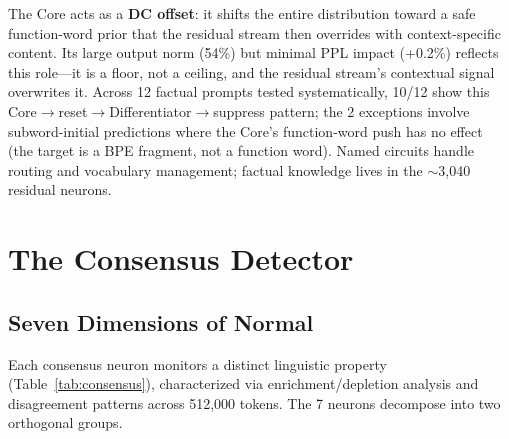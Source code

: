 \documentclass{article}
\begin{document}
The Core acts as a \textbf{DC offset}: it shifts the entire distribution toward
a safe function-word prior that the residual stream then overrides with
context-specific content.
Its large output norm (54\%) but minimal PPL impact (+0.2\%) reflects this
role---it is a floor, not a ceiling, and the residual stream's contextual
signal overwrites it.
Across 12 factual prompts tested systematically, 10/12 show this
Core$\to$reset$\to$Differentiator$\to$suppress pattern; the 2 exceptions
involve subword-initial predictions where the Core's function-word push
has no effect (the target is a BPE fragment, not a function word).
Named circuits handle routing and vocabulary management; factual knowledge
lives in the $\sim$3{,}040 residual neurons.

\section{The Consensus Detector}
\label{sec:consensus}

\subsection{Seven Dimensions of Normal}

Each consensus neuron monitors a distinct linguistic property
(Table~\ref{tab:consensus}), characterized via enrichment/depletion analysis
and disagreement patterns across 512,000 tokens.
The 7 neurons decompose into two orthogonal groups.
\end{document}
